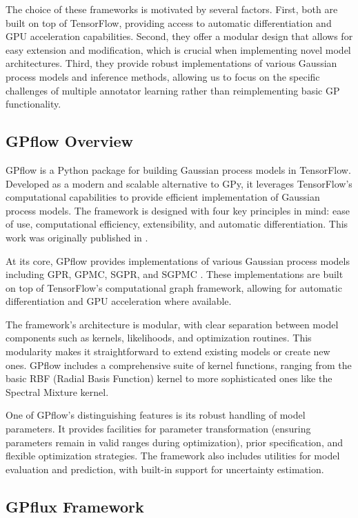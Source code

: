The choice of these frameworks is motivated by several factors.
First, both are built on top of TensorFlow, providing access to
automatic differentiation and GPU acceleration capabilities. Second,
they offer a modular design that allows for
easy extension and modification, which is crucial when implementing
novel model architectures. Third, they provide robust
implementations of various Gaussian process models and inference
methods, allowing us to focus on the specific challenges of multiple
annotator learning rather than reimplementing basic GP functionality.

\subsection{GPflow Overview}

GPflow is a Python package for building Gaussian process models in
TensorFlow. Developed as a modern and scalable alternative to GPy, it
leverages TensorFlow's computational capabilities to provide
efficient implementation of Gaussian process models. The framework is
designed with four key principles in mind: ease of use, computational
efficiency, extensibility, and automatic differentiation. This work
was originally published in \cite{MatthewsEtAl2016}.

At its core, GPflow provides implementations of various Gaussian
process models including \gls{GPR}, \gls{GPMC}, \gls{SGPR}, and
\gls{SGPMC} \cite{MatthewsEtAl2016}. These implementations are built on top of
TensorFlow's computational graph framework, allowing for automatic
differentiation and GPU acceleration where available.

The framework's architecture is modular, with clear separation
between model components such as kernels, likelihoods, and
optimization routines. This modularity makes it straightforward to
extend existing models or create new ones. GPflow includes a
comprehensive suite of kernel functions, ranging from the basic RBF
(Radial Basis Function) kernel to more sophisticated ones like the
Spectral Mixture kernel.

One of GPflow's distinguishing features is its robust handling of
model parameters. It provides facilities for parameter transformation
(ensuring parameters remain in valid ranges during optimization),
prior specification, and flexible optimization strategies. The
framework also includes utilities for model evaluation and
prediction, with built-in support for uncertainty estimation.

\subsection{GPflux Framework}

